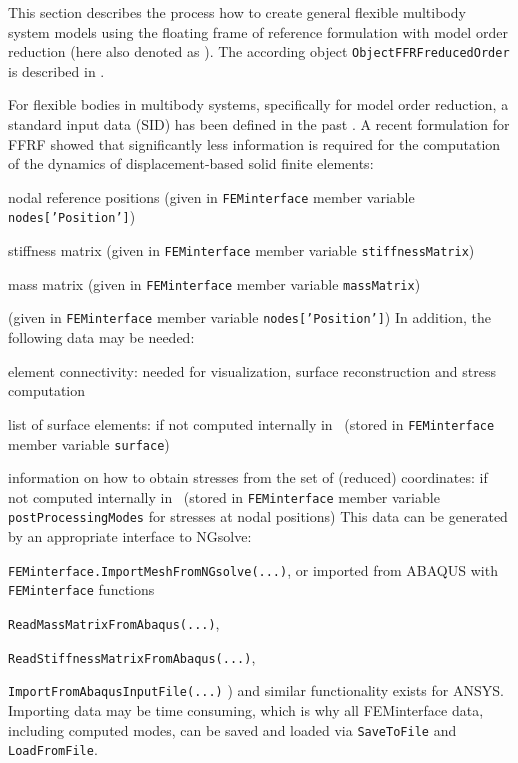 \newpage
{}
\label{sec:theory:CMS}

This section describes the process how to create general flexible multibody system models using the floating frame of reference formulation with model order reduction (here also denoted as ). The according object \texttt{ObjectFFRFreducedOrder} is described in .

%
For flexible bodies in multibody systems, specifically for model order reduction, a standard input data (SID) has been defined in the past \cite{Schwertassek1999}.
A recent formulation for \ac{FFRF} \cite{ZwoelferGerstmayr2021} showed that significantly less information is required for the computation of the dynamics of displacement-based solid finite elements:
\bi
  \item nodal reference positions (given in \texttt{FEMinterface} member variable \texttt{nodes['Position']})
  \item stiffness matrix (given in \texttt{FEMinterface} member variable \texttt{stiffnessMatrix})
  \item mass matrix (given in \texttt{FEMinterface} member variable \texttt{massMatrix})
  \item (given in \texttt{FEMinterface} member variable \texttt{nodes['Position']})
\ei
In addition, the following data may be needed:
\bi
  \item element connectivity: needed for visualization, surface reconstruction and stress computation
  \item list of surface elements: if not computed internally in \codeName\ (stored in \texttt{FEMinterface} member variable \texttt{surface})
  \item information on how to obtain stresses from the set of (reduced) coordinates:  if not computed internally in \codeName\ (stored in \texttt{FEMinterface} member variable \texttt{postProcessingModes} for stresses at nodal positions)
\ei
This data can be generated by an appropriate interface to NGsolve:
\bi
  \item \texttt{FEMinterface.ImportMeshFromNGsolve(...)},
\ei
or imported from ABAQUS with \texttt{FEMinterface} functions
\bi
  \item \texttt{ReadMassMatrixFromAbaqus(...)}, 
  \item \texttt{ReadStiffnessMatrixFromAbaqus(...)}, 
  \item \texttt{ImportFromAbaqusInputFile(...)} )
\ei
and similar functionality exists for ANSYS.
Importing data may be time consuming, which is why all FEMinterface data, including computed modes, can be saved and loaded via
\texttt{SaveToFile} and \texttt{LoadFromFile}. 

